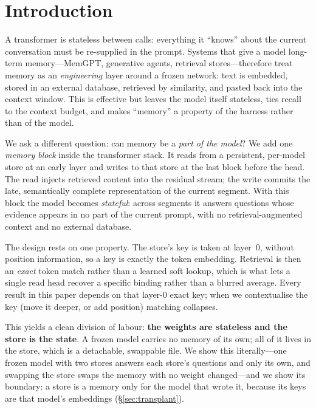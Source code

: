 \section{Introduction}

A transformer is stateless between calls: everything it ``knows'' about the
current conversation must be re-supplied in the prompt. Systems that give a model
long-term memory---MemGPT, generative agents, retrieval stores---therefore treat
memory as an \emph{engineering} layer around a frozen network: text is embedded,
stored in an external database, retrieved by similarity, and pasted back into the
context window. This is effective but leaves the model itself stateless, ties
recall to the context budget, and makes ``memory'' a property of the harness
rather than of the model.

We ask a different question: can memory be a \emph{part of the model}? We add one
\emph{memory block} inside the transformer stack. It reads from a persistent,
per-model store at an early layer and writes to that store at the last block
before the head. The read injects retrieved content into the residual stream; the
write commits the late, semantically complete representation of the current
segment. With this block the model becomes \emph{stateful}: across segments it
answers questions whose evidence appears in no part of the current prompt, with
no retrieval-augmented context and no external database.

The design rests on one property. The store's key is taken at layer~0, without
position information, so a key is exactly the token embedding. Retrieval is then
an \emph{exact} token match rather than a learned soft lookup, which is what lets
a single read head recover a specific binding rather than a blurred average.
Every result in this paper depends on that layer-0 exact key; when we contextualise
the key (move it deeper, or add position) matching collapses.

This yields a clean division of labour: \textbf{the weights are stateless and the
store is the state}. A frozen model carries no memory of its own; all of it lives in
the store, which is a detachable, swappable file. We show this literally---one frozen
model with two stores answers each store's questions and only its own, and swapping the
store swaps the memory with no weight changed---and we show its boundary: a store is a
memory only for the model that wrote it, because its keys are that model's embeddings
(\S\ref{sec:transplant}).

